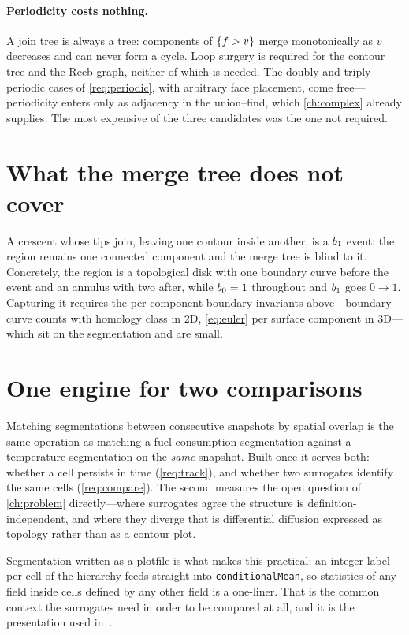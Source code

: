 \paragraph{Periodicity costs nothing.} A join tree is always a tree: components
of $\{f > v\}$ merge monotonically as $v$ decreases and can never form a cycle.
Loop surgery is required for the contour tree and the Reeb graph, neither of
which is needed. The doubly and triply periodic cases of \ref{req:periodic},
with arbitrary face placement, come free---periodicity enters only as adjacency
in the union--find, which \cref{ch:complex} already supplies. The most expensive
of the three candidates was the one not required.

\section{What the merge tree does not cover}

A crescent whose tips join, leaving one contour inside another, is a
$b_{1}$ event: the region remains one connected component and the merge tree
is blind to it. Concretely, the region is a topological disk with one boundary
curve before the event and an annulus with two after, while
$b_{0} = 1$ throughout and $b_{1}$ goes $0 \to 1$. Capturing it requires
the per-component boundary invariants above---boundary-curve counts with homology
class in 2D, \cref{eq:euler} per surface component in 3D---which sit on the
segmentation and are small.

\section{One engine for two comparisons}
\label{sec:overlap}

Matching segmentations between consecutive snapshots by spatial overlap is the
same operation as matching a fuel-consumption segmentation against a temperature
segmentation on the \emph{same} snapshot. Built once it serves both: whether a
cell persists in time (\ref{req:track}), and whether two surrogates identify the
same cells (\ref{req:compare}). The second measures the open question of
\cref{ch:problem} directly---where surrogates agree the structure is
definition-independent, and where they diverge that is differential diffusion
expressed as topology rather than as a contour plot.

Segmentation written as a plotfile is what makes this practical: an integer label
per cell of the hierarchy feeds straight into \texttt{conditionalMean}, so
statistics of any field inside cells defined by any other field is a one-liner.
That is the common context the surrogates need in order to be compared at all,
and it is the presentation used in~\cite{bremer2010burning}.


